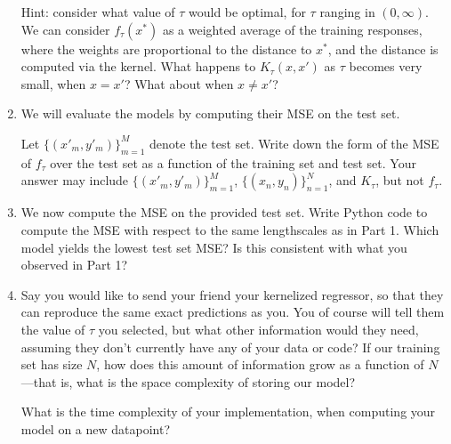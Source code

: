 \documentclass[submit]{harvardml}
\begin{document}
\begin{problem}
\begin{enumerate}
Hint: consider what value of $\tau$ would be optimal, for $\tau$ ranging in $(0, \infty)$. We can consider $f_\tau(x^*)$ as a weighted average of the training responses, where the weights are proportional to the distance to $x^*$, and the distance is computed via the kernel. What happens to $K_\tau(x, x')$ as $\tau$ becomes very small, when $x = x'$? What about when $x \neq x'$?

\item We will evaluate the models by computing their MSE on the test set. 

Let $\{(x'_m, y'_m)\}_{m = 1} ^M$ denote the test set. Write down the form of the MSE of $f_\tau$ over the test set as a function of the training set and test set. Your answer may include $\{(x'_m, y'_m)\}_{m = 1} ^M$, $\{(x_n, y_n)\}_{n = 1} ^N$, and $K_\tau$, but not $f_\tau$.

\item We now compute the MSE on the provided test set. Write Python code to compute the MSE with respect to the same lengthscales as in Part 1. Which model yields the lowest test set MSE? Is this consistent with what you observed in Part 1?

\item 
Say you would like to send your friend your kernelized regressor, so that they can reproduce the same exact predictions as you. You of course will tell them the value of $\tau$ you selected, but what other information would they need, assuming they don't currently have any of your data or code? If our training set has size $N$, how does this amount of information grow as a function of $N$—that is, what is the space complexity of storing our model?

What is the time complexity of your implementation, when computing your model on a new datapoint? 
\end{enumerate}

\end{problem}

\newpage
\end{document}
